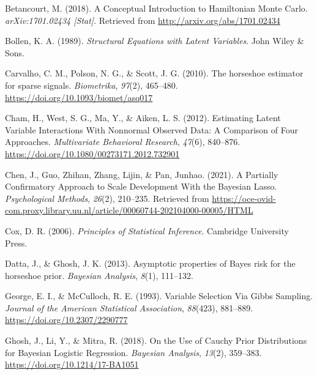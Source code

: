 \documentclass[
  english,
  man, donotrepeattitle,floatsintext]{apa6}
\newlength{\cslhangindent}
\newlength{\cslentryspacingunit} %
\newenvironment{CSLReferences}[2] %
 {%
  \setlength{\parindent}{0pt}
  \ifodd #1
  \let\oldpar\par
  \def\par{\hangindent=\cslhangindent\oldpar}
  \fi
  \setlength{\parskip}{#2\cslentryspacingunit}
 }%
 {}
\begin{document}
\hypertarget{refs}{}
\begin{CSLReferences}{1}{0}
\leavevmode{}%
Betancourt, M. (2018). A {Conceptual} {Introduction} to {Hamiltonian} {Monte} {Carlo}. \emph{arXiv:1701.02434 {[}Stat{]}}. Retrieved from \url{http://arxiv.org/abs/1701.02434}

\leavevmode{}%
Bollen, K. A. (1989). \emph{Structural {Equations} with {Latent} {Variables}}. John Wiley \& Sons.

\leavevmode{}%
Carvalho, C. M., Polson, N. G., \& Scott, J. G. (2010). The horseshoe estimator for sparse signals. \emph{Biometrika}, \emph{97}(2), 465--480. \url{https://doi.org/10.1093/biomet/asq017}

\leavevmode{}%
Cham, H., West, S. G., Ma, Y., \& Aiken, L. S. (2012). Estimating {Latent} {Variable} {Interactions} {With} {Nonnormal} {Observed} {Data}: {A} {Comparison} of {Four} {Approaches}. \emph{Multivariate Behavioral Research}, \emph{47}(6), 840--876. \url{https://doi.org/10.1080/00273171.2012.732901}

\leavevmode{}%
Chen, J., Guo, Zhihan, Zhang, Lijin, \& Pan, Junhao. (2021). A {Partially} {Confirmatory} {Approach} to {Scale} {Development} {With} the {Bayesian} {Lasso}. \emph{Psychological Methods}, \emph{26}(2), 210--235. Retrieved from \url{https://oce-ovid-com.proxy.library.uu.nl/article/00060744-202104000-00005/HTML}

\leavevmode{}%
Cox, D. R. (2006). \emph{Principles of {Statistical} {Inference}}. Cambridge University Press.

\leavevmode{}%
Datta, J., \& Ghosh, J. K. (2013). Asymptotic properties of {Bayes} risk for the horseshoe prior. \emph{Bayesian Analysis}, \emph{8}(1), 111--132.

\leavevmode{}%
George, E. I., \& McCulloch, R. E. (1993). Variable {Selection} {Via} {Gibbs} {Sampling}. \emph{Journal of the American Statistical Association}, \emph{88}(423), 881--889. \url{https://doi.org/10.2307/2290777}

\leavevmode{}%
Ghosh, J., Li, Y., \& Mitra, R. (2018). On the {Use} of {Cauchy} {Prior} {Distributions} for {Bayesian} {Logistic} {Regression}. \emph{Bayesian Analysis}, \emph{13}(2), 359--383. \url{https://doi.org/10.1214/17-BA1051}


\end{CSLReferences}
\end{document}
